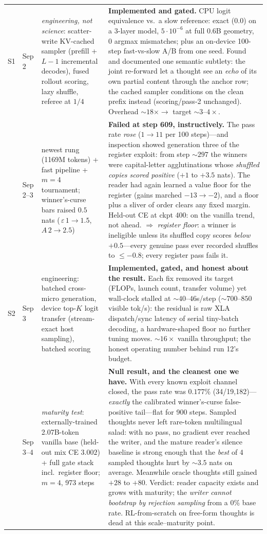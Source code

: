 \documentclass{article} %
\begin{document}
{\begin{longtable}{@{}llp{3.6cm}p{5.6cm}@{}}
\addlinespace
S1 & Sep 2 & \emph{engineering, not science}: scatter-write KV-cached sampler (prefill + $L{-}1$ incremental decodes), fused rollout scoring, lazy shuffle, referee at $1/4$ & \textbf{Implemented and gated.} CPU logit equivalence vs.\ a slow reference: exact ($0.0$) on a 3-layer model, $5{\cdot}10^{-6}$ at full 0.6B geometry, 0 argmax mismatches; plus an on-device 100-step fast-vs-slow A/B from one seed. Found and documented one semantic subtlety: the joint re-forward let a thought see an \emph{echo} of its own partial content through the anchor row; the cached sampler conditions on the clean prefix instead (scoring/pass-2 unchanged). Overhead ${\sim}18\times \to$ target ${\sim}3$--$4\times$. \\
\addlinespace
11 & Sep 2--3 & newest rung (1169M tokens) + fast pipeline + $m{=}4$ tournament; winner's-curse bars raised $0.5$ nats (\,$\varepsilon\,1{\to}1.5$, $A\,2{\to}2.5$) & \textbf{Failed at step 609, instructively.} The pass rate \emph{rose} ($1 \to 11$ per 100 steps)---and inspection showed generation three of the register exploit: from step ${\sim}297$ the winners were capital-letter agglutinations whose \emph{shuffled copies scored positive} ($+1$ to $+3.5$ nats). The reader had again learned a value floor for the register (gains marched $-13 \to -2$), and a floor plus a sliver of order clears any fixed margin. Held-out CE at ckpt 400: on the vanilla trend, not ahead. $\Rightarrow$ \emph{register floor}: a winner is ineligible unless its shuffled copy scores \emph{below} $+0.5$---every genuine pass ever recorded shuffles to $\le -0.8$; every register pass fails it. \\
\addlinespace
S2 & Sep 3 & engineering: batched cross-micro generation, device top-$K$ logit transfer (stream-exact host sampling), batched scoring & \textbf{Implemented, gated, and honest about the result.} Each fix removed its target (FLOPs, launch count, transfer volume) yet wall-clock stalled at ${\sim}40$--$46$s/step (${\sim}700$--$850$ visible tok/s): the residual is raw XLA dispatch/sync latency of serial tiny-batch decoding, a hardware-shaped floor no further tuning moves. ${\sim}16\times$ vanilla throughput; the honest operating number behind run 12's budget. \\
\addlinespace
12 & Sep 3--4 & \emph{maturity test}: externally-trained 2.07B-token vanilla base (held-out mix CE $3.002$) + full gate stack incl.\ register floor; $m{=}4$, 973 steps & \textbf{Null result, and the cleanest one we have.} With every known exploit channel closed, the pass rate was $0.177\%$ (34/19{,}182)---\emph{exactly} the calibrated winner's-curse false-positive tail---flat for 900 steps. Sampled thoughts never left rare-token multilingual salad: with no pass, no gradient ever reached the writer, and the mature reader's silence baseline is strong enough that the \emph{best} of 4 sampled thoughts hurt by ${\sim}3.5$ nats on average. Meanwhile oracle thoughts still gained $+28$ to $+80$. Verdict: reader capacity exists and grows with maturity; the \emph{writer cannot bootstrap by rejection sampling} from a 0\% base rate. RL-from-scratch on free-form thoughts is dead at this scale--maturity point. \\

\end{longtable}}
\end{document}
